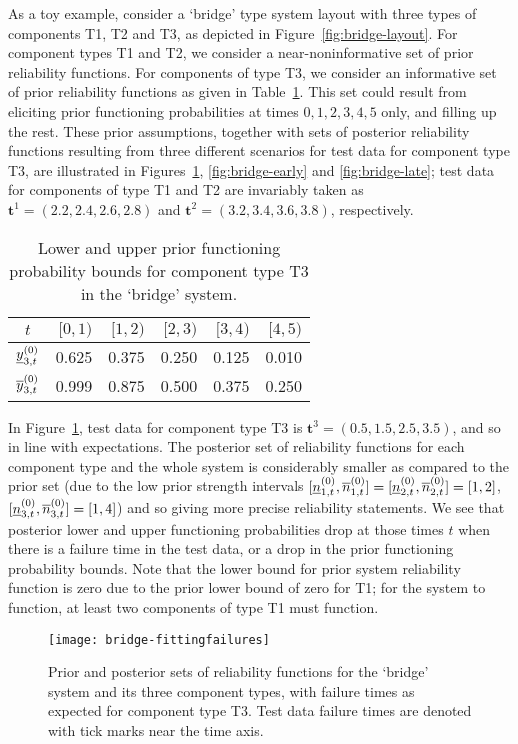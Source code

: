 \documentclass[12pt, a4paper]{elsarticle}
\newcommand{\bs}[1]{\boldsymbol{#1}}
\renewcommand{\vec}[1]{{\bs#1}}
\begin{document}
As a toy example, consider a `bridge' type system layout with three types of components T1, T2 and T3,
as depicted in Figure~\ref{fig:bridge-layout}.
For component types T1 and T2, we consider a near-noninformative set of prior reliability functions.
For components of type T3, we consider an informative set of prior reliability functions
as given in Table~\ref{tab:bridge-T3prior}.
This set could result from eliciting prior functioning probabilities at times $0,1,2,3,4,5$ only,
and filling up the rest.
These prior assumptions, together with sets of posterior reliability functions
resulting from three different scenarios for test data for component type T3,
are illustrated in Figures~\ref{fig:bridge-fitting}, \ref{fig:bridge-early} and \ref{fig:bridge-late}; 
test data for components of type T1 and T2 are invariably taken as
$\vec{t}^1 = (2.2, 2.4, 2.6, 2.8)$ and $\vec{t}^2 = (3.2, 3.4, 3.6, 3.8)$, respectively.

\begin{table}
\centering
\begin{tabular}{crrrrr}
\toprule
$t$ & $[0,1)$ & $[1,2)$ & $[2,3)$ & $[3,4)$ & $[4,5)$ \\
\midrule
$\underline{y}^{(0)}_{3,t}$ & 0.625 & 0.375 & 0.250 & 0.125 & 0.010 \\
$\overline{y}^{(0)}_{3,t}$ & 0.999 & 0.875 & 0.500 & 0.375 & 0.250 \\
\bottomrule
\end{tabular}
\caption{Lower and upper prior functioning probability bounds for component type T3 in the `bridge' system.}
\label{tab:bridge-T3prior}
\end{table}

In Figure~\ref{fig:bridge-fitting}, 
test data for component type T3 is $\vec{t}^3 = (0.5, 1.5, 2.5, 3.5)$,
and so in line with expectations.
The posterior set of reliability functions for each component type and the whole system
is considerably smaller as compared to the prior set
(due to the low prior strength intervals
$[\underline{n}^{(0)}_{1,t},\overline{n}^{(0)}_{1,t}] = [\underline{n}^{(0)}_{2,t},\overline{n}^{(0)}_{2,t}] = [1,2]$, $[\underline{n}^{(0)}_{3,t},\overline{n}^{(0)}_{3,t}] = [1,4]$)
and so giving more precise reliability statements.
We see that posterior lower and upper functioning probabilities drop at those times $t$
when there is a failure time in the test data,
or a drop in the prior functioning probability bounds.
Note that the lower bound for prior system reliability function is zero
due to the prior lower bound of zero for T1;
for the system to function, at least two components of type T1 must function.

\begin{figure}
\texttt{[image: bridge-fittingfailures]}
\caption{Prior and posterior sets of reliability functions for the `bridge' system and its three component types,
with failure times as expected for component type T3.
Test data failure times are denoted with tick marks near the time axis.}
\label{fig:bridge-fitting}
\end{figure}
\end{document}
